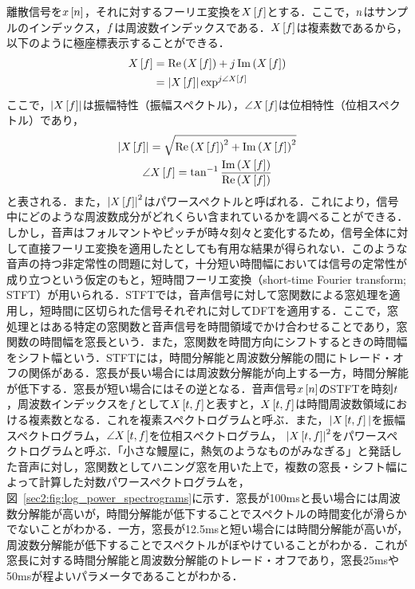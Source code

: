 離散信号を$x\left[n\right]$，それに対するフーリエ変換を$X\left[f\right]$とする．ここで，$n$はサンプルのインデックス，$f$は周波数インデックスである．$X\left[f\right]$は複素数であるから，以下のように極座標表示することができる．
\begin{align}
    X\left[f\right] & = \Re\left(X\left[f\right]\right) + j\Im\left(X\left[f\right]\right)    \\
                       & = \left|X\left[f\right]\right|\exp^{j\angle X\left[f\right]}
\end{align}
ここで，$\left|X\left[f\right]\right|$は振幅特性（振幅スペクトル），$\angle X\left[f\right]$は位相特性（位相スペクトル）であり，
\begin{gather}
    \left|X\left[f\right]\right| = \sqrt{\Re\left(X\left[f\right]\right)^{2} + \Im\left(X\left[f\right]\right)^{2}} \\
    \angle X\left[f\right] = \tan^{-1} \frac{\Im\left(X\left[f\right]\right)}{\Re\left(X\left[f\right]\right)}
\end{gather}
と表される．また，$\left|X\left[f\right]\right|^2$はパワースペクトルと呼ばれる．これにより，信号中にどのような周波数成分がどれくらい含まれているかを調べることができる．しかし，音声はフォルマントやピッチが時々刻々と変化するため，信号全体に対して直接フーリエ変換を適用したとしても有用な結果が得られない．このような音声の持つ非定常性の問題に対して，十分短い時間幅においては信号の定常性が成り立つという仮定のもと，短時間フーリエ変換（short-time Fourier transform; STFT）が用いられる．STFTでは，音声信号に対して窓関数による窓処理を適用し，短時間に区切られた信号それぞれに対してDFTを適用する．ここで，窓処理とはある特定の窓関数と音声信号を時間領域でかけ合わせることであり，窓関数の時間幅を窓長という．また，窓関数を時間方向にシフトするときの時間幅をシフト幅という．STFTには，時間分解能と周波数分解能の間にトレード・オフの関係がある．窓長が長い場合には周波数分解能が向上する一方，時間分解能が低下する．窓長が短い場合にはその逆となる．音声信号$x\left[n\right]$のSTFTを時刻$t$，周波数インデックスを$f$として$X\left[t, f\right]$と表すと，$X\left[t, f\right]$は時間周波数領域における複素数となる．これを複素スペクトログラムと呼ぶ．また，$|X\left[t, f\right]|$を振幅スペクトログラム，$\angle X\left[t, f\right]$を位相スペクトログラム，
$\left|X\left[t, f\right]\right|^{2}$をパワースペクトログラムと呼ぶ．「小さな鰻屋に，熱気のようなものがみなぎる」と発話した音声に対し，窓関数としてハニング窓を用いた上で，複数の窓長・シフト幅によって計算した対数パワースペクトログラムを，図~\ref{sec2:fig:log_power_spectrograms}に示す．窓長が100msと長い場合には周波数分解能が高いが，時間分解能が低下することでスペクトルの時間変化が滑らかでないことがわかる．一方，窓長が12.5msと短い場合には時間分解能が高いが，周波数分解能が低下することでスペクトルがぼやけていることがわかる．これが窓長に対する時間分解能と周波数分解能のトレード・オフであり，窓長25msや50msが程よいパラメータであることがわかる．
